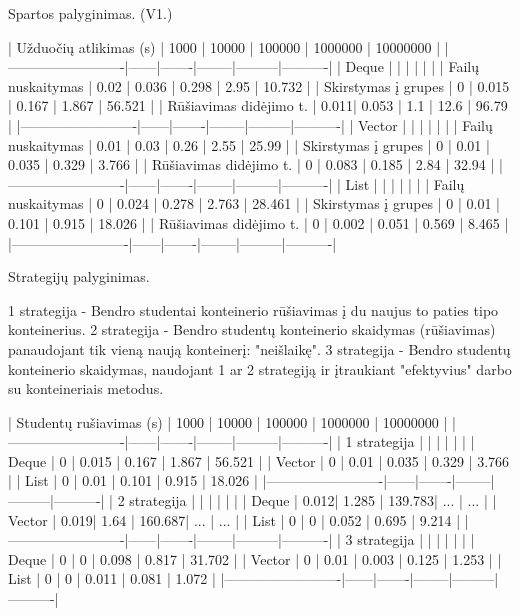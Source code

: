 Spartos palyginimas. (V1.) \begin{DoxyVerb}| Užduočių atlikimas (s)  | 1000 | 10000 | 100000 | 1000000 | 10000000 |
|-------------------------|------|-------|--------|---------|----------|
| Deque                   |      |       |        |         |          |
| Failų nuskaitymas       | 0.02 | 0.036 | 0.298  |  2.95   |  10.732  |
| Skirstymas į grupes     | 0    | 0.015 | 0.167  |  1.867  |  56.521  |
| Rūšiavimas didėjimo t.  | 0.011| 0.053 | 1.1    |  12.6   |  96.79   |
|-------------------------|------|-------|--------|---------|----------|
| Vector                  |      |       |        |         |          |
| Failų nuskaitymas       | 0.01 | 0.03  | 0.26   |  2.55   |  25.99   |
| Skirstymas į grupes     | 0    | 0.01  | 0.035  |  0.329  |  3.766   |
| Rūšiavimas didėjimo t.  | 0    | 0.083 | 0.185  |  2.84   |  32.94   |
|-------------------------|------|-------|--------|---------|----------|
| List                    |      |       |        |         |          |
| Failų nuskaitymas       | 0    | 0.024 | 0.278  |  2.763  |  28.461  |
| Skirstymas į grupes     | 0    | 0.01  | 0.101  |  0.915  |  18.026  |
| Rūšiavimas didėjimo t.  | 0    | 0.002 | 0.051  |  0.569  |  8.465   |
|-------------------------|------|-------|--------|---------|----------|
\end{DoxyVerb}


Strategijų palyginimas. \begin{DoxyVerb}1 strategija - Bendro studentai konteinerio rūšiavimas į du naujus to paties tipo konteinerius.
2 strategija - Bendro studentų konteinerio skaidymas (rūšiavimas) panaudojant tik vieną naują konteinerį: "neišlaikę".
3 strategija - Bendro studentų konteinerio skaidymas, naudojant 1 ar 2 strategiją ir įtraukiant "efektyvius" darbo su konteineriais metodus.

| Studentų rušiavimas (s) | 1000 | 10000 | 100000 | 1000000 | 10000000 |
|-------------------------|------|-------|--------|---------|----------|
| 1 strategija            |      |       |        |         |          |
| Deque                   | 0    | 0.015 | 0.167  |  1.867  |  56.521  |
| Vector                  | 0    | 0.01  | 0.035  |  0.329  |  3.766   |
| List                    | 0    | 0.01  | 0.101  |  0.915  |  18.026  |
|-------------------------|------|-------|--------|---------|----------|
| 2 strategija            |      |       |        |         |          |
| Deque                   | 0.012| 1.285 | 139.783|   ...   |    ...   |
| Vector                  | 0.019| 1.64  | 160.687|   ...   |    ...   |
| List                    | 0    | 0     | 0.052  |  0.695  |  9.214   |
|-------------------------|------|-------|--------|---------|----------|
| 3 strategija            |      |       |        |         |          |
| Deque                   | 0    | 0     | 0.098  |  0.817  |  31.702  |
| Vector                  | 0    | 0.01  | 0.003  |  0.125  |  1.253   |
| List                    | 0    | 0     | 0.011  |  0.081  |  1.072   |
|-------------------------|------|-------|--------|---------|----------|
\end{DoxyVerb}


